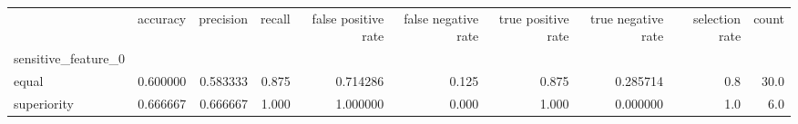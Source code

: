 \begin{tabular}{lrrrrrrrrr}
\toprule
{} &  accuracy &  precision &  recall &  false positive rate &  false negative rate &  true positive rate &  true negative rate &  selection rate &  count \\
sensitive\_feature\_0 &           &            &         &                      &                      &                     &                     &                 &        \\
\midrule
equal               &  0.600000 &   0.583333 &   0.875 &             0.714286 &                0.125 &               0.875 &            0.285714 &             0.8 &   30.0 \\
superiority         &  0.666667 &   0.666667 &   1.000 &             1.000000 &                0.000 &               1.000 &            0.000000 &             1.0 &    6.0 \\
\bottomrule
\end{tabular}
